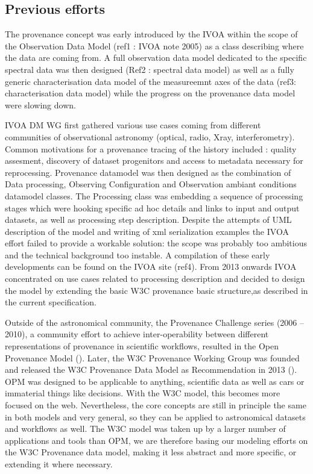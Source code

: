 \subsection{Previous efforts}
The provenance concept was early introduced by the IVOA within the scope of the Observation Data Model (ref1 : IVOA note 2005) as a class describing where the data are coming from. A full observation data model dedicated to the specific spectral data was then designed (Ref2 : spectral data model) as well as a fully generic characterisation data model of the measureemnt axes of the data (ref3: characterisation data model) while the progress on the provenance data model were slowing down.

IVOA DM WG first gathered various use cases coming from different communities of observational  astronomy (optical,  radio, Xray, interferometry). Common motivations for a provenance tracing of the history included : quality assesment, discovery of dataset progenitors and access to metadata necessary for reprocessing. Provenance datamodel was then designed as the combination of Data processing, Observing Configuration and Observation ambiant conditions datamodel classes. 
The Processing class was embedding a sequence of processing stages which were hooking specific ad hoc details and links to input and output datasets, as well as processing step description. 
Despite the attempts of UML description of the model and writing of xml serialization examples the IVOA effort failed to provide a workable solution:  the scope was probably too ambitious and the technical background too instable. A compilation of these early developments can be found on the IVOA site (ref4). From 2013 onwards IVOA concentrated on use cases related to processing description and decided to design the model  by extending the basic W3C provenance basic structure,as described in the current specification. 

Outside of the astronomical community, the Provenance Challenge series (2006 -- 2010), a community effort to achieve inter-operability between different representations of provenance in scientific workflows, resulted in the Open Provenance Model (\cite{moreau2010}). 
Later, the W3C Provenance Working Group was founded and released the W3C Provenance Data Model as Recommendation in 2013 (\cite{std:W3CProvDM}). 
OPM was designed to be applicable to anything, scientific data as well as cars or immaterial things like decisions. With the W3C model, this becomes more focused on the web.  Nevertheless, the core concepts are still in principle the same in both models and very general, so they can be applied to astronomical datasets and workflows as well. 
The W3C model was taken up by a larger number of applications and tools than OPM, we are therefore basing our modeling efforts on the W3C Provenance data model, making it less abstract and more specific, or extending it where necessary. 


